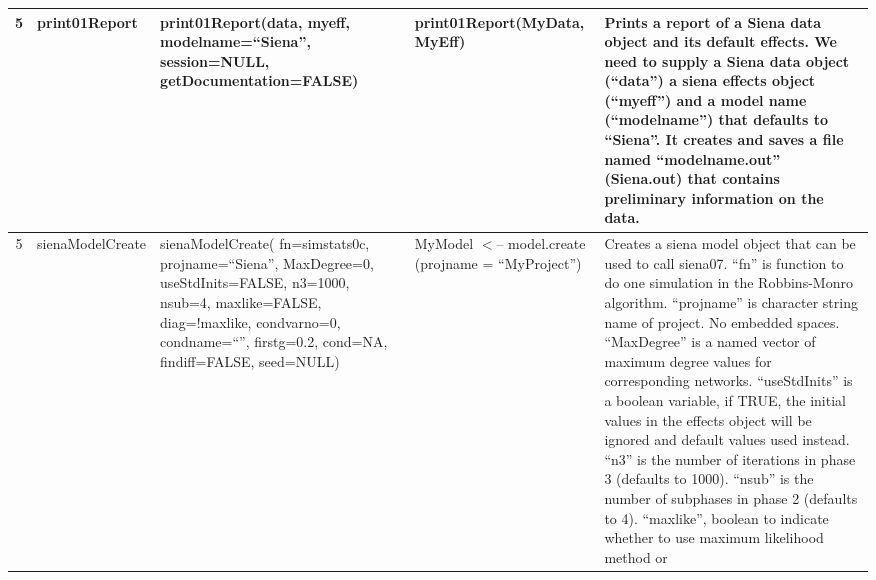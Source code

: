 \documentclass[a4paper,fleqn,11pt]{article}
\newcommand{\+}{\, + \,}
\begin{document}
{\begin{landscape}
\begin{small}
\begin{longtable}{c | p{2.4cm} | p{4.5cm} | p{4.0cm} | p{9.0cm} }
5 & print01Report & print01Report(data, myeff, \newline
modelname=``Siena'',\newline
session=NULL, \newline
getDocumentation=FALSE) & print01Report(MyData, MyEff) & Prints a
report of a Siena data object and its default effects. We need to supply a
Siena data object (``data'') a siena effects object (``myeff'') and a model
name (``modelname'') that defaults to ``Siena''. It creates and saves a file
named ``modelname.out'' (Siena.out) that contains preliminary information
on the data.\\
\hline

5 & sienaModelCreate & sienaModelCreate(\newline
fn=simstats0c,\newline
projname=``Siena'', \newline
MaxDegree=0, \newline
useStdInits=FALSE, n3=1000, \newline
nsub=4, maxlike=FALSE, \newline
diag=!maxlike, \newline
condvarno=0, \newline
condname=``'', firstg=0.2, \newline
cond=NA, findiff=FALSE, \newline
seed=NULL) &
\newline
MyModel $<$-- model.create \newline
(projname = \newline
``MyProject'') & Creates a siena model
object that can be used to call siena07. ``fn'' is function to do one
simulation in the Robbins-Monro algorithm.
``projname'' is character string name of
project. No embedded spaces. ``MaxDegree'' is a named vector of maximum degree
values for corresponding networks. ``useStdInits'' is a boolean variable, if
TRUE, the initial values in the effects object will be ignored and default
values used instead. ``n3'' is the number of iterations in phase 3 (defaults to
1000). ``nsub'' is the number of subphases in phase 2 (defaults to 4).
``maxlike'', boolean to indicate whether to use maximum likelihood method or

\end{longtable}
\end{small}
\end{landscape}}
\end{document}

